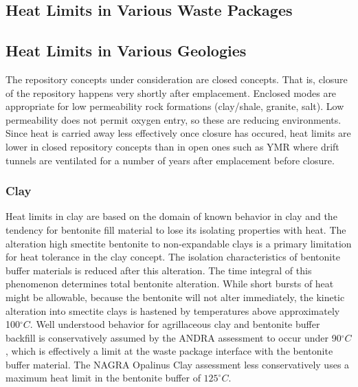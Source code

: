 \subsection{Heat Limits in Various Waste Packages} 




\subsection{Heat Limits in Various Geologies}





The repository concepts under consideration are closed concepts. That is, 
closure of the repository happens very shortly after emplacement.
Enclosed modes are appropriate for low permeability rock formations (clay/shale, 
granite, salt). Low permeability does not permit oxygen entry, so these are
reducing environments. Since heat is carried away less effectively once closure 
has occured, heat limits are lower in  closed repository concepts than in open 
ones such as \gls{YMR} where drift tunnels are ventilated for a number of years
after emplacement before closure.

\subsubsection{Clay} 

Heat limits in clay are based on the domain of known behavior in clay and the 
tendency for bentonite fill material to lose its isolating properties with heat. 
The alteration high smectite bentonite to non-expandable clays is a primary 
limitation for heat tolerance in the clay concept. The isolation characteristics 
of bentonite buffer materials is reduced after this alteration. The time 
integral of this phenomenon determines total bentonite alteration. While short 
bursts of heat might be allowable, because the bentonite will not alter 
immediately, the kinetic alteration into smectite clays is hastened by 
temperatures above approximately 100$^\circ C$. \cite{pusch_alteration_1987} 
Well understood behavior for agrillaceous clay and bentonite buffer backfill
is conservatively assumed by the \gls{ANDRA} assessment to occur under 
90$^\circ C$, which is effectively a limit at the waste package interface with 
the bentonite buffer material.\cite{andra_argile:_2005} 
The \gls{NAGRA} Opalinus Clay assessment less conservatively 
uses a maximum heat limit in the bentonite buffer of $125^\circ C$.
\cite{johnson_project_2002} 

